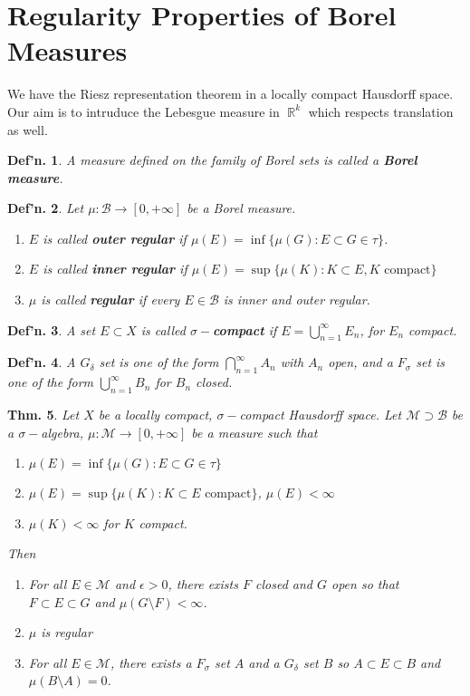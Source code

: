 \documentclass[12pt, a4paper]{book}
\DeclareMathOperator{\R}{\mathbb{R}}
\newtheorem{theorem}{Thm.}[section]
\newtheorem{definition}[theorem]{Def'n.}
\theoremstyle{nonumberplain}
\begin{document}
\section{Regularity Properties of Borel Measures}
We have the Riesz representation theorem in a locally compact Hausdorff space.
Our aim is to intruduce the Lebesgue measure in $\R^k$ which respects translation as well.
\begin{definition}
    A measure defined on the family of Borel sets is called a \textbf{Borel measure}.
\end{definition}
\begin{definition}
    Let $\mu:\mathcal{B}\to[0,+\infty]$ be a Borel measure.
    \begin{enumerate}[nolistsep]
        \item $E$ is called \textbf{outer regular} if $\mu(E)=\inf\{\mu(G):E\subset G\in\tau\}$.
        \item $E$ is called \textbf{inner regular} if $\mu(E)=\sup\{\mu(K):K\subset E,K\text{ compact}\}$
        \item $\mu$ is called \textbf{regular} if every $E\in\mathcal{B}$ is inner and outer regular.
    \end{enumerate}
\end{definition}
\begin{definition}
    A set $E\subset X$ is called \textbf{$\sigma-$compact} if $E=\bigcup\limits_{n=1}^\infty E_n$, for $E_n$ compact.
\end{definition}
\begin{definition}
    A $G_\delta$ set is one of the form $\bigcap\limits_{n=1}^\infty A_n$ with $A_n$ open, and a $F_\sigma$ set is one of the form $\bigcup\limits_{n=1}^\infty B_n$ for $B_n$ closed.
\end{definition}
\begin{theorem}
    Let $X$ be a locally compact, $\sigma-$compact Hausdorff space.
    Let $\mathcal{M}\supset\mathcal{B}$ be a $\sigma-$algebra, $\mu:\mathcal{M}\to[0,+\infty]$ be a measure such that
    \begin{enumerate}[nolistsep,label=(\roman*)]
        \item $\mu(E)=\inf\{\mu(G):E\subset G\in\tau\}$
        \item $\mu(E)=\sup\{\mu(K):K\subset E\text{ compact}\}$, $\mu(E)<\infty$
        \item $\mu(K)<\infty$ for $K$ compact.
    \end{enumerate}
    Then
    \begin{enumerate}[nolistsep]
        \item For all $E\in\mathcal{M}$ and $\epsilon>0$, there exists $F$ closed and $G$ open so that $F\subset E\subset G$ and $\mu(G\setminus F)<\infty$.
        \item $\mu$ is regular
        \item For all $E\in\mathcal{M}$, there exists a $F_\sigma$ set $A$ and a $G_\delta$ set $B$ so $A\subset E\subset B$ and $\mu(B\setminus A)=0$.
    \end{enumerate}
\end{theorem}
\end{document}
